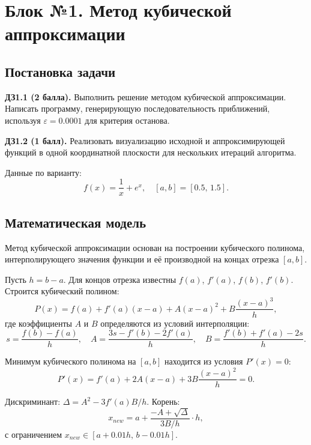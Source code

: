 \section{Блок №1. Метод кубической аппроксимации}

\subsection{Постановка задачи}

\textbf{ДЗ1.1 (2 балла).} Выполнить решение методом кубической аппроксимации. Написать программу, генерирующую последовательность приближений, используя $\varepsilon = 0.0001$ для критерия останова.

\textbf{ДЗ1.2 (1 балл).} Реализовать визуализацию исходной и аппроксимирующей функций в одной координатной плоскости для нескольких итераций алгоритма.

Данные по варианту:
\begin{equation}\label{eq:func1}
    f(x) = \frac{1}{x} + e^x, \quad [a, b] = [0.5,\, 1.5].
\end{equation}

\subsection{Математическая модель}

Метод кубической аппроксимации основан на построении кубического полинома, интерполирующего значения функции и её производной на концах отрезка $[a, b]$.

Пусть $h = b - a$. Для концов отрезка известны $f(a)$, $f'(a)$, $f(b)$, $f'(b)$. Строится кубический полином:
\begin{equation}
    P(x) = f(a) + f'(a)(x - a) + A(x - a)^2 + B\frac{(x - a)^3}{h},
\end{equation}
где коэффициенты $A$ и $B$ определяются из условий интерполяции:
\begin{equation}
    s = \frac{f(b) - f(a)}{h}, \quad
    A = \frac{3s - f'(b) - 2f'(a)}{h}, \quad
    B = \frac{f'(b) + f'(a) - 2s}{h}.
\end{equation}

Минимум кубического полинома на $[a, b]$ находится из условия $P'(x) = 0$:
\begin{equation}
    P'(x) = f'(a) + 2A(x - a) + 3B\frac{(x - a)^2}{h} = 0.
\end{equation}

Дискриминант: $\Delta = A^2 - 3f'(a)B/h$. Корень:
\begin{equation}
    x_{new} = a + \frac{-A + \sqrt{\Delta}}{3B/h} \cdot h,
\end{equation}
с ограничением $x_{new} \in [a + 0.01h,\, b - 0.01h]$.

